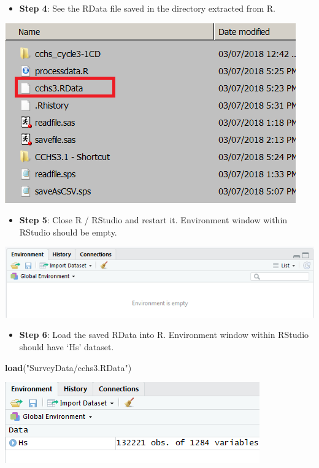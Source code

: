 \documentclass[
]{book}
\newenvironment{Shaded}{\begin{snugshade}}{\end{snugshade}}
\newcommand{\KeywordTok}[1]{\textcolor[rgb]{0.13,0.29,0.53}{\textbf{#1}}}
\newcommand{\NormalTok}[1]{#1}
\newcommand{\StringTok}[1]{\textcolor[rgb]{0.31,0.60,0.02}{#1}}
\providecommand{\tightlist}{%
  \setlength{\itemsep}{0pt}\setlength{\parskip}{0pt}}
\begin{document}
\begin{itemize}
\tightlist
\item
  \textbf{Step 4}: See the RData file saved in the directory extracted from R.
\end{itemize}

\includegraphics[width=0.65\linewidth]{images/abacus43}

\begin{itemize}
\tightlist
\item
  \textbf{Step 5}: Close R / RStudio and restart it. Environment window within RStudio should be empty.
\end{itemize}

\includegraphics[width=0.65\linewidth]{images/abacus44}

\begin{itemize}
\tightlist
\item
  \textbf{Step 6}: Load the saved RData into R. Environment window within RStudio should have `Hs' dataset.
\end{itemize}

\begin{Shaded}
\begin{Highlighting}[]
\KeywordTok{load}\NormalTok{(}\StringTok{"SurveyData/cchs3.RData"}\NormalTok{)}
\end{Highlighting}
\end{Shaded}

\includegraphics[width=0.65\linewidth]{images/abacus45}
\end{document}
